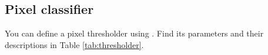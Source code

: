 \documentclass[a4paper,DIV=17,dvipsnames,headsepline]{scrartcl}
\begin{document}

\subsection{Pixel classifier}
You can define a pixel thresholder using . Find its parameters and their descriptions in Table \ref{tab:thresholder}.
\end{document}
